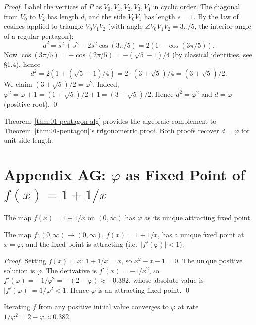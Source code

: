 \begin{proof}
Label the vertices of $P$ as $V_0, V_1, V_2, V_3, V_4$ in cyclic
order. The diagonal from $V_0$ to $V_2$ has length $d$, and the side
$V_0 V_1$ has length $s = 1$. By the law of cosines applied to
triangle $V_0 V_1 V_2$ (with angle $\angle V_0 V_1 V_2 = 3\pi/5$,
the interior angle of a regular pentagon):
\[
  d^2 = s^2 + s^2 - 2 s^2 \cos(3\pi/5) = 2 (1 - \cos(3\pi/5)).
\]
Now $\cos(3\pi/5) = -\cos(2\pi/5) = -(\sqrt 5 - 1)/4$ (by classical
identities, see \cite{coxeter_intro_geometry} \S 1.4), hence
\[
  d^2 = 2 (1 + (\sqrt 5 - 1)/4) = 2 \cdot (3 + \sqrt 5)/4 = (3 +
  \sqrt 5)/2.
\]
We claim $(3 + \sqrt 5)/2 = \varphi^2$. Indeed, $\varphi^2 = \varphi
+ 1 = (1 + \sqrt 5)/2 + 1 = (3 + \sqrt 5)/2$. Hence $d^2 = \varphi^2$
and $d = \varphi$ (positive root).
\qed
\end{proof}

\begin{remark}
Theorem~\ref{thm:01-pentagon-alg} provides the algebraic complement to
Theorem~\ref{thm:01-pentagon}'s trigonometric proof. Both proofs
recover $d = \varphi$ for unit side length.
\end{remark}

\section*{Appendix AG: $\varphi$ as Fixed Point of $f(x) = 1 + 1/x$}
\label{sec:01-app-AG}

The map $f(x) = 1 + 1/x$ on $(0, \infty)$ has $\varphi$ as its unique
attracting fixed point.

\begin{theorem}\label{thm:01-fixed}
The map $f : (0, \infty) \to (0, \infty)$, $f(x) = 1 + 1/x$, has a
unique fixed point at $x = \varphi$, and the fixed point is
attracting (i.e.\ $|f'(\varphi)| < 1$).
\end{theorem}

\begin{proof}
Setting $f(x) = x$: $1 + 1/x = x$, so $x^2 - x - 1 = 0$. The unique
positive solution is $\varphi$. The derivative is $f'(x) = -1/x^2$,
so $f'(\varphi) = -1/\varphi^2 = -(2 - \varphi) \approx -0.382$,
whose absolute value is $|f'(\varphi)| = 1/\varphi^2 < 1$. Hence
$\varphi$ is an attracting fixed point.
\qed
\end{proof}

\begin{corollary}
\label{cor:01-fp-rate}
Iterating $f$ from any positive initial value converges to $\varphi$
at rate $1/\varphi^2 = 2 - \varphi \approx 0.382$.
\end{corollary}


